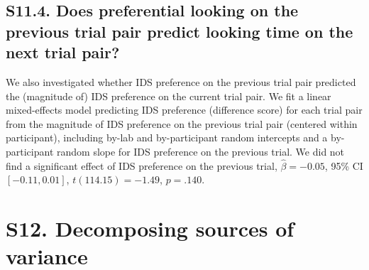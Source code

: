 \documentclass[
  man, donotrepeattitle,floatsintext]{apa6}
\begin{document}
\hypertarget{s11.4.-does-preferential-looking-on-the-previous-trial-pair-predict-looking-time-on-the-next-trial-pair}{%
\subsection{S11.4. Does preferential looking on the previous trial pair predict looking time on the next trial pair?}\label{s11.4.-does-preferential-looking-on-the-previous-trial-pair-predict-looking-time-on-the-next-trial-pair}}

We also investigated whether IDS preference on the previous trial pair predicted the (magnitude of) IDS preference on the current trial pair.
We fit a linear mixed-effects model predicting IDS preference (difference score) for each trial pair from the magnitude of IDS preference on the previous trial pair (centered within participant), including by-lab and by-participant random intercepts and a by-participant random slope for IDS preference on the previous trial.
We did not find a significant effect of IDS preference on the previous trial, \(\hat{\beta} = -0.05\), 95\% CI \([-0.11, 0.01]\), \(t(114.15) = -1.49\), \(p = .140\).

\hypertarget{s12.-decomposing-sources-of-variance}{%
\section{S12. Decomposing sources of variance}\label{s12.-decomposing-sources-of-variance}}
\end{document}
